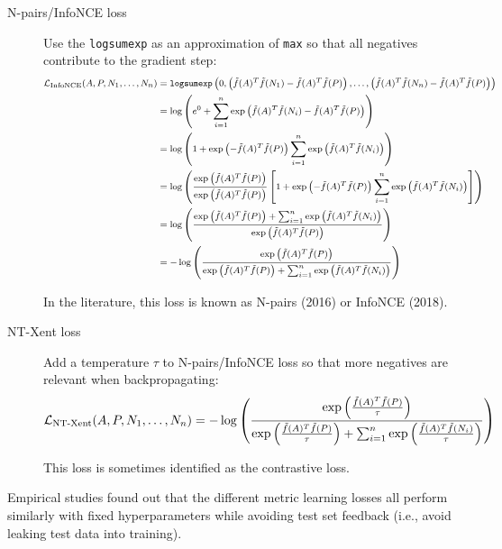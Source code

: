 \begin{description}
    \item[N-pairs/InfoNCE loss] 
        Use the \texttt{logsumexp} as an approximation of \texttt{max} so that all negatives contribute to the gradient step:
        \[
            \footnotesize
            \begin{split}
                \mathcal{L}_\text{InfoNCE}(A, P, N_1, \dots, N_n) &= \texttt{logsumexp}\left( 0, 
                \left(\tilde{f}(A)^T \tilde{f}(N_1) - \tilde{f}(A)^T \tilde{f}(P)\right),
                \dots, \left(\tilde{f}(A)^T \tilde{f}(N_n) - \tilde{f}(A)^T \tilde{f}(P)\right) \right) \\
                &= \log\left( e^0 + \sum_{i=1}^{n} \exp\left(\tilde{f}(A)^T\tilde{f}(N_i) - \tilde{f}(A)^T\tilde{f}(P)\right) \right) \\
                &= \log\left( 1 + \exp\left(-\tilde{f}(A)^T\tilde{f}(P)\right) \sum_{i=1}^{n} \exp\left(\tilde{f}(A)^T\tilde{f}(N_i)\right) \right) \\
                &= \log\left(
                    \frac{\exp\left( \tilde{f}(A)^T\tilde{f}(P) \right)}{\exp\left( \tilde{f}(A)^T\tilde{f}(P) \right)}
                    \left[1 + \exp\left(-\tilde{f}(A)^T\tilde{f}(P)\right) \sum_{i=1}^{n} \exp\left(\tilde{f}(A)^T\tilde{f}(N_i)\right) \right] 
                    \right) \\
                &= \log\left( \frac{\exp\left( \tilde{f}(A)^T\tilde{f}(P) \right) + \sum_{i=1}^{n} \exp\left(\tilde{f}(A)^T\tilde{f}(N_i)\right)}{\exp\left( \tilde{f}(A)^T\tilde{f}(P) \right)} \right) \\
                &= -\log\left( \frac{\exp\left( \tilde{f}(A)^T\tilde{f}(P) \right)}{\exp\left( \tilde{f}(A)^T\tilde{f}(P) \right) + \sum_{i=1}^{n} \exp\left(\tilde{f}(A)^T\tilde{f}(N_i)\right)} \right) \\
            \end{split}
        \]

        \begin{remark}
            In the literature, this loss is known as N-pairs (2016) or InfoNCE (2018).
        \end{remark}

    \item[NT-Xent loss] 
        Add a temperature $\tau$ to N-pairs/InfoNCE loss so that more negatives are relevant when backpropagating:
        \[ 
            \small
            \mathcal{L}_\text{NT-Xent}(A, P, N_1, \dots, N_n) =
            -\log\left( \frac{\exp\left( \frac{\tilde{f}(A)^T\tilde{f}(P)}{\tau} \right)}{\exp\left( \frac{\tilde{f}(A)^T\tilde{f}(P)}{\tau} \right) + \sum_{i=1}^{n} \exp\left(\frac{\tilde{f}(A)^T\tilde{f}(N_i)}{\tau}\right)} \right)
        \]

        \begin{remark}
            This loss is sometimes identified as the contrastive loss.
        \end{remark}
\end{description}

\begin{remark}
    Empirical studies found out that the different metric learning losses all perform similarly with fixed hyperparameters while avoiding test set feedback (i.e., avoid leaking test data into training).
\end{remark}